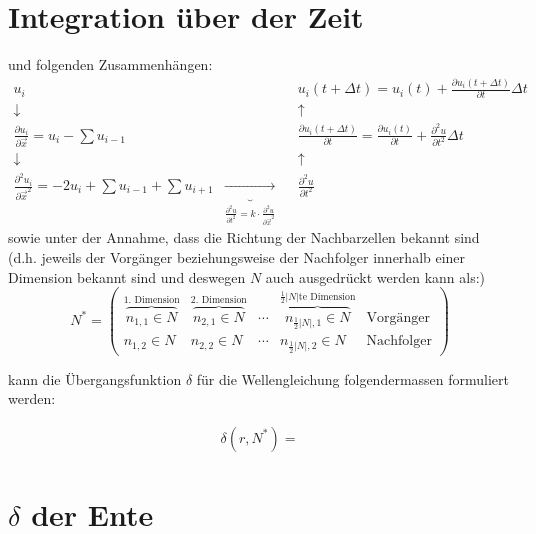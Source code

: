 \documentclass[11pt]{article} %
\theoremstyle{definition}
\begin{document}
\section{Integration über der Zeit}



und folgenden Zusammenhängen:
\begin{align*}
u_i &&& u_i(t+\Delta t) = u_i(t) +  \frac{\partial u_i(t+\Delta t)}{\partial t}\Delta t \\
\downarrow &&& \uparrow \\
\frac{\partial u_i}{\partial \vec x} = u_i - \sum u_{i-1} &&& \frac{\partial u_i(t+\Delta t)}{\partial t} = \frac{\partial u_i(t)}{\partial t} + \frac{\partial^2 u}{\partial t^2}\Delta t \\
\downarrow &&& \uparrow \\
\frac{\partial^2 u_i}{\partial \vec x^2} = -2u_i + \sum u_{i-1} + \sum u_{i+1} & \underbrace{\longrightarrow}_{\frac{\partial^2 u}{\partial t^2} = k\cdot \frac{\partial^2 u}{\partial \vec{x}^2}} && \frac{\partial^2 u}{\partial t^2}
\end{align*}
sowie unter der Annahme, dass die Richtung der Nachbarzellen bekannt sind (d.h. jeweils der Vorgänger beziehungsweise der Nachfolger innerhalb einer Dimension bekannt sind und deswegen $N$ auch ausgedrückt werden kann als:)
\[
N^* =\begin{pmatrix} \overbrace{n_{1,1} \in N}^{\textrm{1. Dimension}} & \overbrace{n_{2,1} \in N}^{\textrm{2. Dimension}} & \cdots & \overbrace{n_{\frac{1}{2}|N|, 1} \in N}^{\textrm{$\frac{1}{2}|N|$te Dimension}} & \textrm{Vorgänger} \\
n_{1,2} \in N & n_{2,2} \in N & \cdots & n_{\frac{1}{2}|N|, 2} \in N & \textrm{Nachfolger}
 \end{pmatrix}
\]

kann die Übergangsfunktion $\delta$ für die Wellengleichung folgendermassen formuliert werden:

\begin{eqnarray*}
\delta(r, N^*) = 
\end{eqnarray*}

\section{$\delta$ der Ente}
\end{document}
